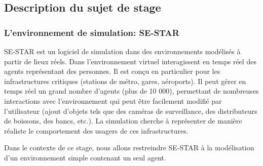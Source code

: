 \subsection{Description du sujet de stage}
\subsubsection{L'environnement de simulation: SE-STAR}

SE-STAR est un logiciel de simulation dans des environnements modélisés à partir
de lieux réels. Dans l’environnement virtuel interagissent en temps réel des
agents représentant des personnes. Il est conçu en particulier pour les
infrastructures critiques (stations de métro, gares, aéroports).
Il peut gérer en temps réel un grand nombre d’agents (plus de 10 000), permettant de nombreuses interactions avec l’environnement qui peut être facilement modifié par l’utilisateur (ajout d’objets tels que des caméras de surveillance, des distributeurs de boissons, des bancs, etc.). La simulation cherche à représenter de manière réaliste le comportement des usagers de ces infrastructures. 

Dans le contexte de ce stage, nous allons restreindre SE-STAR à la modélisation d'un environnement simple contenant un seul agent. 

